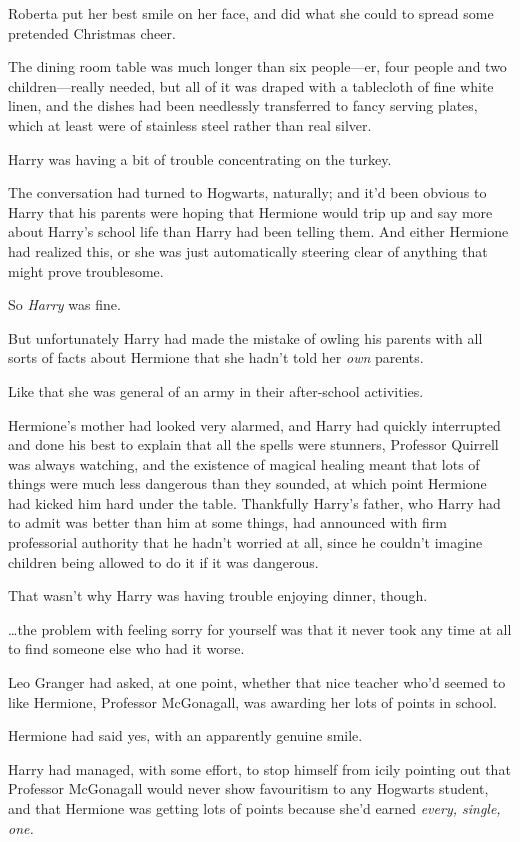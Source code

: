 Roberta put her best smile on her face, and did what she could to spread some pretended Christmas cheer.

\later

The dining room table was much longer than six people—er, four people and two children—really needed, but all of it was draped with a tablecloth of fine white linen, and the dishes had been needlessly transferred to fancy serving plates, which at least were of stainless steel rather than real silver.

Harry was having a bit of trouble concentrating on the turkey.

The conversation had turned to Hogwarts, naturally; and it’d been obvious to Harry that his parents were hoping that Hermione would trip up and say more about Harry’s school life than Harry had been telling them. And either Hermione had realized this, or she was just automatically steering clear of anything that might prove troublesome.

So \emph{Harry} was fine.

But unfortunately Harry had made the mistake of owling his parents with all sorts of facts about Hermione that she hadn’t told her \emph{own} parents.

Like that she was general of an army in their after-school activities.

Hermione’s mother had looked very alarmed, and Harry had quickly interrupted and done his best to explain that all the spells were stunners, Professor Quirrell was always watching, and the existence of magical healing meant that lots of things were much less dangerous than they sounded, at which point Hermione had kicked him hard under the table. Thankfully Harry’s father, who Harry had to admit was better than him at some things, had announced with firm professorial authority that he hadn’t worried at all, since he couldn’t imagine children being allowed to do it if it was dangerous.

That wasn’t why Harry was having trouble enjoying dinner, though.

…the problem with feeling sorry for yourself was that it never took any time at all to find someone else who had it worse.

Leo Granger had asked, at one point, whether that nice teacher who’d seemed to like Hermione, Professor McGonagall, was awarding her lots of points in school.

Hermione had said yes, with an apparently genuine smile.

Harry had managed, with some effort, to stop himself from icily pointing out that Professor McGonagall would never show favouritism to any Hogwarts student, and that Hermione was getting lots of points because she’d earned \emph{every, single, one.}

